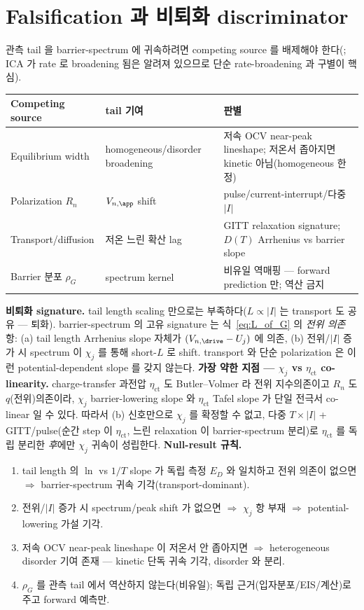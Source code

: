 \section{Falsification 과 비퇴화 discriminator}\label{sec:falsify}
관측 tail 을 barrier-spectrum 에 귀속하려면 competing source 를 배제해야 한다(; ICA 가 rate 로
broadening 됨은 알려져 있으므로 \cite{dubarry2022,fly2020} 단순 rate-broadening 과 구별이 핵심).
\begin{longtable}{p{} p{} p{}}
\toprule Competing source & tail 기여 & 판별 \\ \midrule \endhead
Equilibrium width & homogeneous/disorder broadening & 저속 OCV near-peak lineshape; 저온서 좁아지면 kinetic 아님(homogeneous 한정) \\
Polarization $R_n$ & $V_{n,\app}$ shift & pulse/current-interrupt/다중 $|I|$ \\
Transport/diffusion & 저온 느린 확산 lag & GITT relaxation signature; $D(T)$ Arrhenius vs barrier slope \\
Barrier 분포 $\rho_G$ \cite{plonka2001} & spectrum kernel & 비유일 역매핑 — forward prediction 만; 역산 금지 \\
\bottomrule
\end{longtable}
\textbf{비퇴화 signature.} tail length scaling 만으로는 부족하다($L\propto|I|$ 는 transport 도 공유 —
퇴화). barrier-spectrum 의 고유 signature 는 식~\eqref{eq:L_of_G} 의 \emph{전위 의존} 항: (a) tail length
Arrhenius slope 자체가 $(V_{n,\drive}-U_j)$ 에 의존, (b) 전위/$|I|$ 증가 시 spectrum 이 $\chi_j$ 를 통해
short-$L$ 로 shift. transport 와 단순 polarization 은 이런 potential-dependent slope 를 갖지 않는다.
\textbf{가장 약한 지점 — $\chi_j$ vs $\eta_\mathrm{ct}$ co-linearity.} charge-transfer 과전압
$\eta_\mathrm{ct}$ 도 Butler--Volmer 라 전위 지수의존이고 $R_n$ 도 $q$(전위)의존이라, $\chi_j$
barrier-lowering slope 와 $\eta_\mathrm{ct}$ Tafel slope 가 단일 전극서 co-linear 일 수 있다. 따라서 (b)
신호만으로 $\chi_j$ 를 확정할 수 없고, 다중 $T\times|I|$ + GITT/pulse(순간 step 이 $\eta_\mathrm{ct}$, 느린
relaxation 이 barrier-spectrum 분리)로 $\eta_\mathrm{ct}$ 를 독립 분리한 \emph{후}에만 $\chi_j$ 귀속이 성립한다.
\textbf{Null-result 규칙.}
\begin{enumerate}[label=(N\arabic*),leftmargin=2.2em]
\item tail length 의 $\ln$ vs $1/T$ slope 가 독립 측정 $E_D$ 와 일치하고 전위 의존이 없으면 $\Rightarrow$
  barrier-spectrum 귀속 기각(transport-dominant).
\item 전위/$|I|$ 증가 시 spectrum/peak shift 가 없으면 $\Rightarrow$ $\chi_j$ 항 부재 $\Rightarrow$
  potential-lowering 가설 기각.
\item 저속 OCV near-peak lineshape 이 저온서 안 좁아지면 $\Rightarrow$ heterogeneous disorder 기여 존재 —
  kinetic 단독 귀속 기각, disorder 와 분리.
\item $\rho_G$ 를 관측 tail 에서 역산하지 않는다(비유일); 독립 근거(입자분포/EIS/계산)로 주고 forward 예측만.
\end{enumerate}

